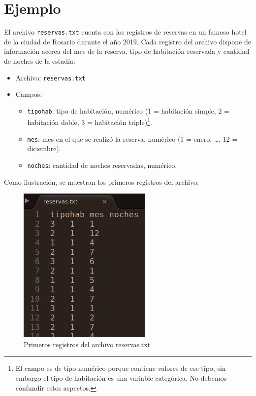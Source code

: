 \documentclass[
]{book}
\providecommand{\tightlist}{%
  \setlength{\itemsep}{0pt}\setlength{\parskip}{0pt}}
\begin{document}
\hypertarget{ejemplo}{%
\section{Ejemplo}\label{ejemplo}}

El archivo \texttt{reservas.txt} cuenta con los registros de reservas en un famoso hotel de la ciudad de Rosario durante el año 2019. Cada registro del archivo dispone de información acerca del mes de la reserva, tipo de habitación reservada y cantidad de noches de la estadía:

\begin{itemize}
\item
  Archivo: \texttt{reservas.txt}
\item
  Campos:

  \begin{itemize}
  \tightlist
  \item
    \texttt{tipohab}: tipo de habitación, numérico (1 = habitación simple, 2 = habitación doble, 3 = habitación triple)\footnote{El campo es de tipo numérico porque contiene valores de ese tipo, sin embargo el tipo de habitación es una variable categórica. No debemos confundir estos aspectos.}.
  \item
    \texttt{mes}: mes en el que se realizó la reserva, numérico (1 = enero, \ldots, 12 = diciembre).
  \item
    \texttt{noches}: cantidad de noches reservadas, numérico.
  \end{itemize}
\end{itemize}

Como ilustración, se muestran los primeros registros del archivo:

\begin{figure}

{\centering \includegraphics[width=0.3\linewidth]{images/06_archivos/arch00} 

}

\caption{Primeros registros del archivo reservas.txt}\label{fig:unnamed-chunk-143}
\end{figure}
\end{document}
